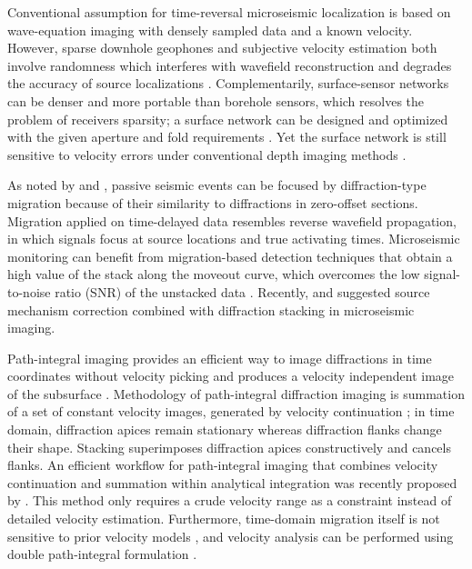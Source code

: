 Conventional assumption for time-reversal microseismic localization is based on wave-equation imaging with densely sampled data and a known velocity.
However, sparse downhole geophones and subjective velocity estimation both involve randomness which interferes with wavefield reconstruction and degrades the accuracy of source localizations \cite[]{sava2011micro}.
Complementarily, surface-sensor networks can be denser and more portable than borehole sensors, which resolves the problem of receivers sparsity; a surface network can be designed and optimized with the given aperture and fold requirements \cite[]{duncan2010reservoir}.
Yet the surface network is still sensitive to velocity errors under conventional depth imaging methods \cite[]{eisner2009uncertainties}.

As noted by \cite{kao2004source} and \cite{gajewski2007localization}, passive seismic events can be focused by diffraction-type migration because of their similarity to diffractions in zero-offset sections.
Migration applied on time-delayed data resembles reverse wavefield propagation, in which signals focus at source locations and true activating times.
Microseismic monitoring can benefit from migration-based detection techniques that obtain a high value of the stack along the moveout curve, which overcomes the low signal-to-noise ratio (SNR) of the unstacked data \cite[]{chambers2010testing,duncan2010reservoir,gharti2010automated,bradford2013application}.
Recently, \cite{anikiev2013imaging} and \cite{stanvek2015semblance} suggested source mechanism correction combined with diffraction stacking in microseismic imaging.

Path-integral imaging provides an efficient way to image diffractions in time coordinates without velocity picking and produces a velocity independent image of the subsurface \cite[]{landa2006path}.
Methodology of path-integral diffraction imaging \cite[]{burnett2011diffraction} is summation of a set of constant velocity images, generated by velocity continuation \cite[]{fomel2003velocity}; in time domain, diffraction apices remain stationary whereas diffraction flanks change their shape. Stacking superimposes diffraction apices constructively and cancels flanks.
An efficient workflow for path-integral imaging that combines velocity continuation and summation within analytical integration was recently proposed by \cite{merzlikin2015efficient}.
This method only requires a crude velocity range as a constraint instead of detailed velocity estimation.
Furthermore, time-domain migration itself is not sensitive to prior velocity models \cite[]{fomel2014recent}, and velocity analysis can be performed using double path-integral formulation \cite[]{schleicher2009migration,merzlikin2015efficient}.

